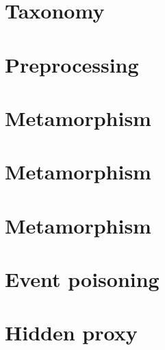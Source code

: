 
\pagestyle{empty}

\backgroundbarvisiblefalse
\backgroundtitlevisiblefalse
{}

\section{Taxonomy}

\newpage\section{Preprocessing}

\newpage\section{Metamorphism}

\newpage\section{Metamorphism}

\newpage\section{Metamorphism}

\newpage\section{Event poisoning}

\newpage\section{Hidden proxy}

\coverpage{\TITLE}{\SUBTITLE}{\AUTHOR}{\DATE}{\SUBJECT}


